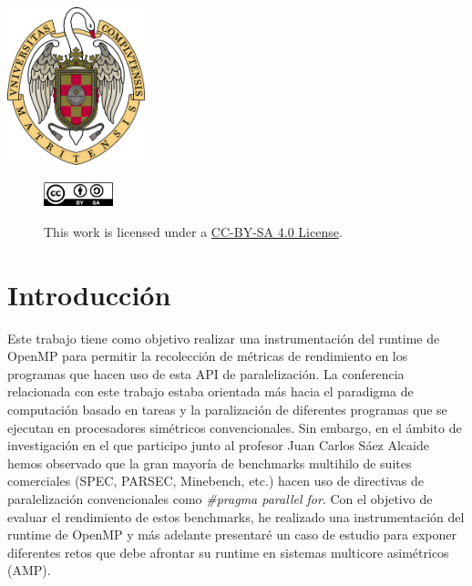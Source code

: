 \begin{titlepage}
\includegraphics[width=4cm,keepaspectratio]{logo.png}
 

\vfill %



\captionsetup[figure]{labelformat=empty,justification=raggedright,singlelinecheck=false}
\begin{figure}[h]

        \includegraphics[width=2cm,keepaspectratio]{cc-by-sa.png}
        \label{fig:by-sa}
        \caption{ This work is licensed under a \href{https://creativecommons.org/licenses/by/4.0/legalcode}{CC-BY-SA 4.0 License}.}

\end{figure}

\end{titlepage}

\tableofcontents
\clearpage



\section{Introducción}\label{sec:intro}

Este trabajo tiene como objetivo realizar una instrumentación del runtime de OpenMP para permitir la recolección de métricas de rendimiento en los programas que hacen uso de esta API de paralelización. La conferencia relacionada con este trabajo estaba orientada más hacia el paradigma de computación basado en tareas y la paralización de diferentes programas que se ejecutan en procesadores simétricos convencionales. Sin embargo, en el ámbito de investigación en el que participo junto al profesor Juan Carlos Sáez Alcaide hemos observado que la gran mayoría de benchmarks multihilo de suites comerciales (SPEC, PARSEC, Minebench, etc.) hacen uso de directivas de paralelización convencionales como \textit{\#pragma parallel for}. Con el objetivo de evaluar el rendimiento de estos benchmarks, he realizado una instrumentación del runtime de OpenMP y más adelante presentaré un caso de estudio para exponer diferentes retos que debe afrontar su runtime en sistemas multicore asimétricos (AMP). 


